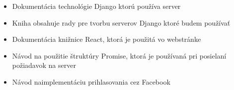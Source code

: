 \documentclass[11pt,a4paper]{article}
\begin{document}
\begin{itemize}

\item {}

Dokumentácia technológie Django ktorú používa server

\item {}

Kniha obsahuje rady pre tvorbu serverov Django ktoré budem používať

\item {}

Dokumentácia knižnice React, ktorá je použitá vo webstránke

\item {}

Návod na použitie štruktúry Promise, ktorá je používaná pri posielaní požiadavok na server

\item {}

Návod naimplementáciu prihlasovania cez Facebook

\end{itemize}


 
\end{document}
